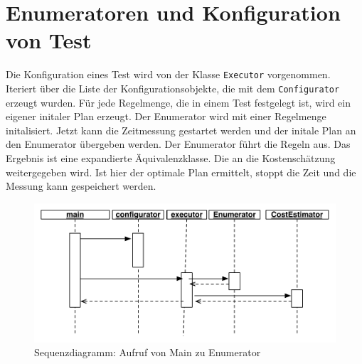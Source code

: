 \section{Enumeratoren und Konfiguration von Test}

Die Konfiguration eines Test wird von der Klasse \texttt{Executor} vorgenommen. Iteriert über die Liste der Konfigurationsobjekte, die mit dem \texttt{Configurator} erzeugt wurden. Für jede Regelmenge, die in einem Test festgelegt ist, wird ein eigener initaler Plan erzeugt. Der Enumerator wird mit einer Regelmenge initalisiert. Jetzt kann die Zeitmessung gestartet werden und der initale Plan an den Enumerator übergeben werden. Der Enumerator führt die Regeln aus. Das Ergebnis ist eine expandierte Äquivalenzklasse. Die an die Kostenschätzung weitergegeben wird. Ist hier der optimale Plan ermittelt, stoppt die Zeit und die Messung kann gespeichert werden.



\begin{figure}[ht]
  \centering
  \includegraphics[width=\textwidth]{04_Implementierung/00_media/SequenceDiagramConfiguration.pdf}
  \caption{Sequenzdiagramm: Aufruf von Main zu Enumerator}
  \label{SequenceDiagramConfiguration}
\end{figure}
